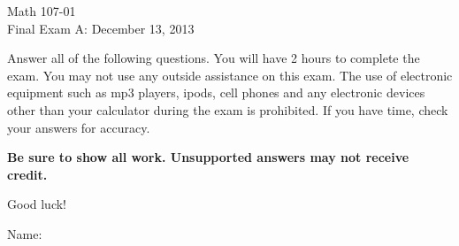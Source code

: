 \documentclass[12pt]{article}
\begin{document}
\pagestyle{empty}


\begin{center}
\begin{large}
Math 107-01\\
Final Exam A: December 13, 2013
\end{large}
\end{center}

\begin{small} Answer all of the following questions.  You will have 2 hours to complete the
exam. You may not use any outside assistance on this exam.  The use of
electronic equipment such as mp3 players, ipods, cell phones and any
electronic devices other than your calculator during the exam is
prohibited.  If you have time, check your answers for accuracy.

\textbf{Be sure to show all work. Unsupported answers may not
receive credit.}

Good luck!\end{small}

\vspace{ .15 in}
Name: \underline{\qquad \qquad \qquad \qquad \qquad \qquad \qquad \qquad \qquad \qquad}\\
\end{document}
